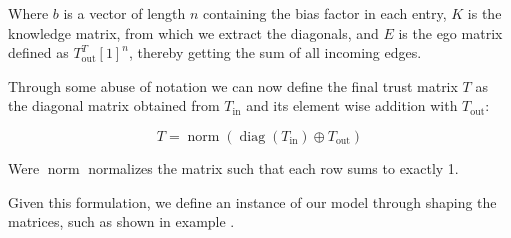 Where $b$ is a vector of length $n$ containing the bias factor in each entry,
$K$ is the knowledge matrix, from which we extract the diagonals, and $E$ is
the ego matrix defined as $T_{\text{out}}^T [1]^n$, thereby getting the sum of
all incoming edges.

Through some abuse of notation we can now define the final trust matrix $T$ as the diagonal matrix obtained from $T_{\text{in}}$ and its element wise addition with $T_{\text{out}}$:

\begin{equation}
	T = \operatorname{norm}\left(\operatorname{diag}(T_{\text{in}}) \oplus T_{\text{out}}\right)
	\label{eq:final_trust}
\end{equation}

Were $\operatorname{norm}$ normalizes the matrix such that each row sums to exactly 1.


Given this formulation, we define an instance of our model through shaping the
matrices, such as shown in example .

